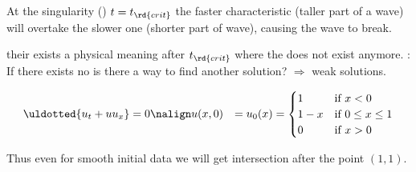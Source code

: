 \begin{notebox}
 At the singularity () $t=t_{\rd{crit}}$ the faster characteristic (taller part of a wave) will overtake the slower one
 (shorter part of wave), causing the wave to break.
    \begin{figure}[H]
        \centering{
            \def\svgwidth{150pt}
            \resizebox{0.8\linewidth}{!}{}
        }
    \end{figure}
     their exists a physical meaning after $t_{\rd{crit}}$ where the  does not exist anymore.
    : If there exists no  is there a way to find another solution? $\Rightarrow$ weak solutions.
\end{notebox}
\begin{examplebox}\nospacing
    \begin{example}\label{example:burgers_equation_continous_initial_data}
        \begin{align*}
              \uldotted{u_t+u u_x}&=0 \nonumber\nalign
              u(x,0)&=u_{0}(x)=\begin{cases}
                    1&\text{if }x<0\\
                    1-x&\text{if }0\leq x\leq 1\\
                    0&\text{if }x>0
                    \end{cases}
        \end{align*}
        \begin{figure}[H]
            \vspace{-1em}
            \centering{
              \def\svgwidth{210pt}
                \resizebox{\linewidth}{!}{}
            }
        \end{figure}
        \begin{figure}[H]
            \vspace{-3em}
            \centering{
              \def\svgwidth{130pt}
              \resizebox{0.7\linewidth}{!}{}
            }
        \end{figure}
        \vspace{-1em}
        Thus even for smooth initial data we will get intersection after the point $(1,1)$.
    \end{example}
\end{examplebox}

